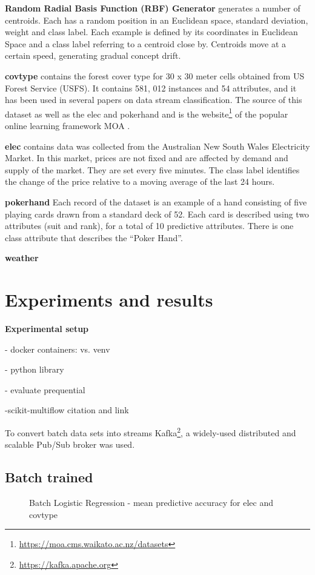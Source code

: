 \documentclass{sig-alternate-br}
\begin{document}
\textbf{Random Radial Basis Function (RBF) Generator} generates a number of centroids. Each
has a random position in an Euclidean space, standard deviation, weight and class label.
Each example is defined by its coordinates in Euclidean Space and a class label referring to a centroid close by. 
Centroids move at a certain speed, generating gradual concept drift. \cite{van2016massively}

\textbf{covtype} contains the forest cover type for 30 x 30 meter cells obtained from US Forest Service (USFS). It contains 581, 012 instances and 54 attributes, and it has been used in several papers on data stream classification. The source of this dataset as well as the elec and pokerhand and is the website\footnote{\url{https://moa.cms.waikato.ac.nz/datasets}} of the popular online learning framework MOA \cite{bifet2010moa}.

\textbf{elec} contains data was collected from the Australian New South Wales Electricity Market. In this market, prices are not fixed and are affected by demand and supply of the market. They are set every five minutes. The class label identifies the change of the price relative to a moving average of the last 24 hours.

\textbf{pokerhand} Each record of the dataset is an example of a hand consisting of five playing cards drawn from a standard deck of 52. Each card is described using two attributes (suit and rank), for a total of 10 predictive attributes. There is one class attribute that describes the “Poker Hand”.

\textbf{weather} 

\section{Experiments and results}
\label{experiments}

\textbf{Experimental setup}

- docker containers: vs. venv

- python library

- evaluate prequential

-scikit-multiflow citation and link

To convert batch data sets into streams Kafka\footnote{\url{https://kafka.apache.org}}, a widely-used distributed and scalable Pub/Sub broker was used.

\subsection{Batch trained}
\begin{figure}[h]
\centering 
{}
\caption{Batch Logistic Regression - mean predictive accuracy for elec and covtype}
\label{fig:bathclr}
\end{figure}
\end{document}
